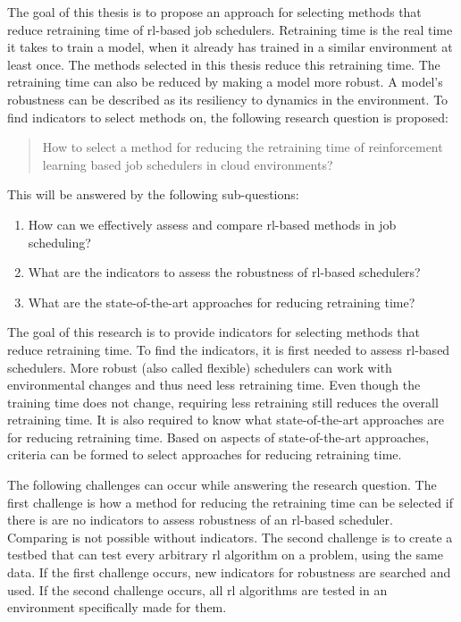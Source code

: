 The goal of this thesis is to propose an approach for selecting methods that
reduce retraining time of \gls{rl}-based job schedulers. Retraining time is
the real time it takes to train a \rl model, when it already has trained in a
similar environment at least once. The methods selected in this thesis reduce
this retraining time. The retraining time can also be reduced by making a model
more robust. A model's robustness can be described as its resiliency to
dynamics in the environment. To find indicators to select methods on, the
following research question is proposed:
\begin{quote}
How to select a method for reducing the retraining time of reinforcement learning
    based job schedulers in cloud environments?
\end{quote}
This will be answered by the following sub-questions:
\begin{enumerate}[noitemsep]
    \item How can we effectively assess and compare \gls{rl}-based methods in job
        scheduling?
    \item What are the indicators to assess the robustness of \gls{rl}-based schedulers?
    \item What are the state-of-the-art approaches for reducing retraining time?
\end{enumerate}
The goal of this research is to provide indicators for selecting methods that
reduce retraining time. To find the indicators, it is first needed to assess
\gls{rl}-based schedulers. More robust (also called flexible) \rlbased schedulers
can work with environmental changes and thus need less retraining time.
Even though the training time does not change, requiring less retraining still
reduces the overall retraining time. It is also required to know what
state-of-the-art approaches are for reducing retraining time. Based on
aspects of state-of-the-art approaches, criteria can be formed to select
approaches for reducing retraining time.

The following challenges can occur while answering the research question. The
first challenge is how a method for reducing the retraining time can be
selected if there is are no indicators to assess robustness of an
\gls{rl}-based scheduler. Comparing is not possible without indicators. The
second challenge is to create a testbed that can test every arbitrary \gls{rl}
algorithm on a \jss problem, using the same data. If the first challenge
occurs, new indicators for robustness are searched and used. If the second
challenge occurs, all \gls{rl} algorithms are tested in an environment
specifically made for them.


